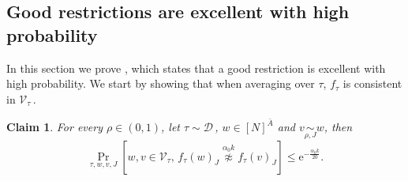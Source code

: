 \documentclass[11pt]{article}
\numberwithin{equation}{section}
\newtheorem{claim}[theorem]{Claim}
\theoremstyle{definition}
\theoremstyle{plain}
\newcommand{\eee}{\mathrm e}
\newcommand{\Prob}[2][]{\Pr_{{#1}}\left[#2\right]} %
\newcommand\f{f} %
\newcommand\neqg[1]{\stackrel{{#1}}{ \not\approx}} %
\newcommand\cons{\mathcal{V}} %
\newcommand\cor[1]{\underset{\scriptscriptstyle#1}{\sim}} %
\newcommand\rest[1]{{\bar{#1}}}  %
\begin{document}
%
\hfill \qedsymbol
        
\subsection{Good restrictions are excellent with high probability}
\label{sec:good implies excellent}
In this section we prove , which states that a good restriction is excellent with high probability. We start by showing that when averaging over $\tau$, $\f_\tau$ is consistent in $\cons_\tau$\,.

\begin{claim}\label{claim:many excellent}
	For every $\rho\in (0,1)$, let $\tau\sim\mathcal{D}$\,, $w\in[N]^{\rest{A}}$ and $v\cor{\rho,J}{w}$, then
	\[ \Prob[\tau, w,v,J]{ w,v\in\cons_\tau, \, f_\tau(w)_J \neqg{\alpha_0 k} f_\tau(v)_J} \leq \eee^{-\frac{\alpha_0 k}{20}}. \]
\end{claim}
\end{document}

